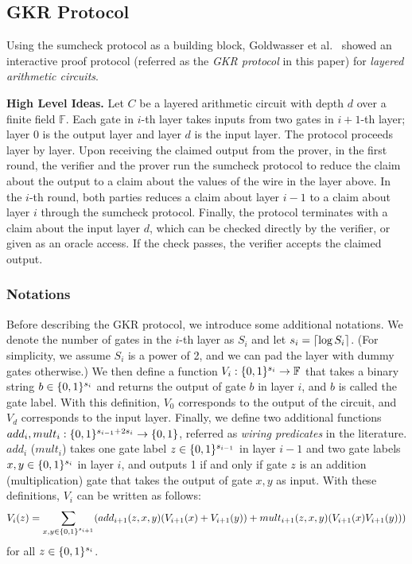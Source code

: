 
\subsection{GKR Protocol}\label{subsec::GKR}


Using the sumcheck protocol as a building block, Goldwasser et al.~\cite{GKR} showed an interactive proof protocol (referred as the \emph{GKR protocol} in this paper) for \textit{layered arithmetic circuits}. 

\smallskip\noindent\textbf{High Level Ideas.} Let $C$ be a layered arithmetic circuit with depth $d$ over a finite field $\mathbb{F}$. Each gate in $i$-th layer takes inputs from two gates in $i+1$-th layer; layer $0$ is the output layer and layer $d$ is the input layer. The protocol proceeds layer by layer. Upon receiving the claimed output from the prover, in the first round, the verifier and the prover run the sumcheck protocol to reduce the claim about the output to a claim about the values of the wire in the layer above. In the $i$-th round, both parties reduces a claim about layer $i-1$ to a claim about layer $i$ through the sumcheck protocol. Finally, the protocol terminates with a claim about the input layer $d$, which can be checked directly by the verifier, or given as an oracle access. If the check passes, the verifier accepts the claimed output. 

\subsubsection{Notations}

Before describing the GKR protocol, we introduce some additional notations. We denote the number of gates in the $i$-th layer as $S_i$ and let $s_i = {\lceil \log S_i \rceil}$. (For simplicity, we assume $S_i$ is a power of 2, and we can pad the layer with dummy gates otherwise.) We then define a function $V_i:\{0,1\}^{s_i}\rightarrow\mathbb{F}$ that takes a binary string $b\in\{0,1\}^{s_i}$ and returns the output of gate $b$ in layer $i$, and $b$ is called the gate label. With this definition, $V_0$ corresponds to the output of the circuit, and $V_d$ corresponds to the input layer. Finally, we define two additional functions $add_i, mult_i: \{0,1\}^{s_{i-1}+2s_i}\rightarrow\{0,1\}$, referred as \emph{wiring predicates} in the literature. $add_i$ ($mult_i$) takes one gate label $z\in\{0,1\}^{s_{i-1}}$ in layer $i-1$ and two gate labels $x,y\in\{0,1\}^{s_i}$ in layer $i$, and outputs 1 if and only if gate $z$ is an addition (multiplication) gate that takes the output of gate $x,y$ as input. With these definitions, $V_i$ can be written as follows:
\begin{equation}
	V_i(z)=\sum_{x, y \in\{0,1\}^{s_{i+1}}}(add_{i+1}(z,x,y)(V_{i+1}(x)+V_{i+1}(y))+mult_{i+1}(z,x,y)(V_{i+1}(x)V_{i+1}(y)))
\end{equation}
for all $z\in\{0,1\}^{s_i}$. 









